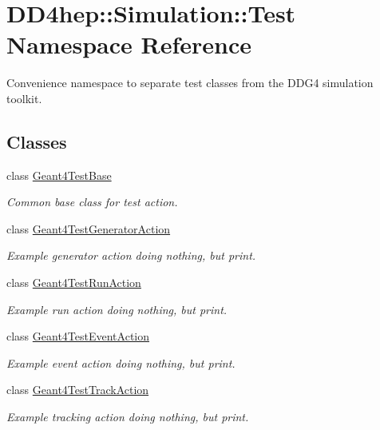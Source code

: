 \hypertarget{namespace_d_d4hep_1_1_simulation_1_1_test}{
\section{DD4hep::Simulation::Test Namespace Reference}
\label{namespace_d_d4hep_1_1_simulation_1_1_test}
}


Convenience namespace to separate test classes from the DDG4 simulation toolkit.  
\subsection*{Classes}
\begin{DoxyCompactItemize}
\item 
class \hyperlink{class_d_d4hep_1_1_simulation_1_1_test_1_1_geant4_test_base}{Geant4TestBase}
\begin{DoxyCompactList}\small\item\em Common base class for test action. \item\end{DoxyCompactList}\item 
class \hyperlink{class_d_d4hep_1_1_simulation_1_1_test_1_1_geant4_test_generator_action}{Geant4TestGeneratorAction}
\begin{DoxyCompactList}\small\item\em Example generator action doing nothing, but print. \item\end{DoxyCompactList}\item 
class \hyperlink{class_d_d4hep_1_1_simulation_1_1_test_1_1_geant4_test_run_action}{Geant4TestRunAction}
\begin{DoxyCompactList}\small\item\em Example run action doing nothing, but print. \item\end{DoxyCompactList}\item 
class \hyperlink{class_d_d4hep_1_1_simulation_1_1_test_1_1_geant4_test_event_action}{Geant4TestEventAction}
\begin{DoxyCompactList}\small\item\em Example event action doing nothing, but print. \item\end{DoxyCompactList}\item 
class \hyperlink{class_d_d4hep_1_1_simulation_1_1_test_1_1_geant4_test_track_action}{Geant4TestTrackAction}
\begin{DoxyCompactList}\small\item\em Example tracking action doing nothing, but print. \item\end{DoxyCompactList}\item 

\end{DoxyCompactItemize}
